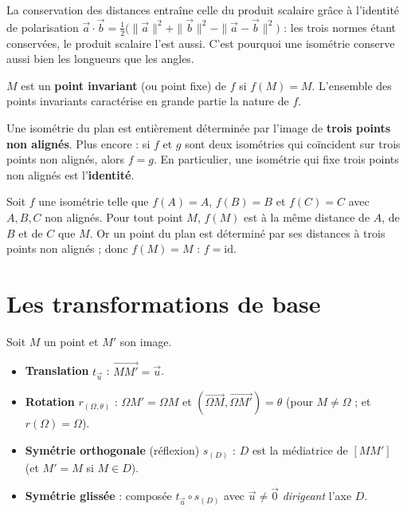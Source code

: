 \begin{remarque}
La conservation des distances entraîne celle du produit scalaire grâce à l'identité de polarisation
$\vec a\cdot\vec b=\tfrac12\big(\|\vec a\|^2+\|\vec b\|^2-\|\vec a-\vec b\|^2\big)$ : les trois normes étant conservées, le produit scalaire l'est aussi. C'est pourquoi une isométrie conserve aussi bien les longueurs que les angles.
\end{remarque}

\begin{definition}
$M$ est un \textbf{point invariant} (ou point fixe) de $f$ si $f(M)=M$. L'ensemble des points invariants caractérise en grande partie la nature de $f$.
\end{definition}

\begin{propriete}
Une isométrie du plan est entièrement déterminée par l'image de \textbf{trois points non alignés}. Plus encore : si $f$ et $g$ sont deux isométries qui coïncident sur trois points non alignés, alors $f=g$. En particulier, une isométrie qui fixe trois points non alignés est l'\textbf{identité}.
\end{propriete}

\begin{exemple}
Soit $f$ une isométrie telle que $f(A)=A$, $f(B)=B$ et $f(C)=C$ avec $A,B,C$ non alignés. Pour tout point $M$, $f(M)$ est à la même distance de $A$, de $B$ et de $C$ que $M$. Or un point du plan est déterminé par ses distances à trois points non alignés ; donc $f(M)=M$ : $f=\mathrm{id}$.
\end{exemple}

\section{Les transformations de base}

\begin{definition}
Soit $M$ un point et $M'$ son image.
\begin{itemize}
\item \textbf{Translation} $t_{\vec u}$ : $\overrightarrow{MM'}=\vec u$.
\item \textbf{Rotation} $r_{(\Omega,\theta)}$ : $\Omega M'=\Omega M$ et $(\overrightarrow{\Omega M},\overrightarrow{\Omega M'})=\theta$ (pour $M\neq\Omega$ ; et $r(\Omega)=\Omega$).
\item \textbf{Symétrie orthogonale} (réflexion) $s_{(D)}$ : $D$ est la médiatrice de $[MM']$ (et $M'=M$ si $M\in D$).
\item \textbf{Symétrie glissée} : composée $t_{\vec u}\circ s_{(D)}$ avec $\vec u\neq\vec0$ \emph{dirigeant} l'axe $D$.
\end{itemize}
\end{definition}

